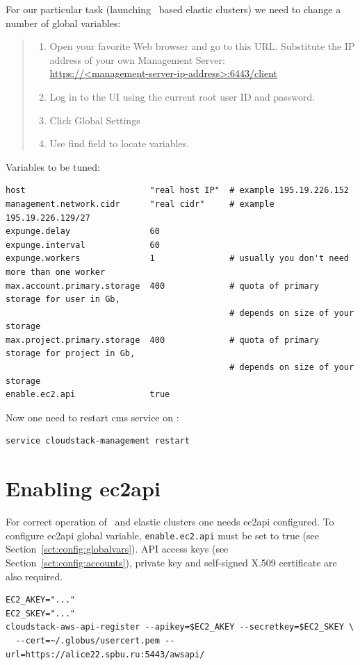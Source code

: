For our particular task (launching \cernvm\ based elastic clusters) we need to change a number of global variables:
\begin{quote}
	\begin{enumerate}
		\item Open your favorite Web browser and go to this URL.
			Substitute the IP address of your own Management Server:\\
			\url{https://<management-server-ip-address>:6443/client}
		\item Log in to the UI using the current root user ID and password. 
		\item Click Global Settings
		\item Use find field to locate variables.
	\end{enumerate}
\end{quote}
Variables to be tuned:
\begin{lstlisting}[deletekeywords={true,enable}]
host                         "real host IP"  # example 195.19.226.152
management.network.cidr      "real cidr"     # example 195.19.226.129/27
expunge.delay                60
expunge.interval             60
expunge.workers              1               # usually you don't need more than one worker
max.account.primary.storage  400             # quota of primary storage for user in Gb,
                                             # depends on size of your storage
max.project.primary.storage  400             # quota of primary storage for project in Gb,
                                             # depends on size of your storage
enable.ec2.api               true
\end{lstlisting}
Now one need to restart \acrshort{cms} service on :
\begin{lstlisting}
service cloudstack-management restart
\end{lstlisting}


\section{Enabling \acrshort{ec2api}}
For correct operation of \cernvm\ and elastic clusters one needs \acrshort{ec2api} configured.
To configure \acrshort{ec2api} global variable, \texttt{enable.ec2.api} must be set to true (see Section~\ref{sct:config:globalvars}). 
API access keys (see Section~\ref{sct:config:accounts}), private key and self-signed X.509 certificate are also required.
\begin{lstlisting}
EC2_AKEY="..."
EC2_SKEY="..."
cloudstack-aws-api-register --apikey=$EC2_AKEY --secretkey=$EC2_SKEY \
  --cert=~/.globus/usercert.pem --url=https://alice22.spbu.ru:5443/awsapi/
\end{lstlisting}



